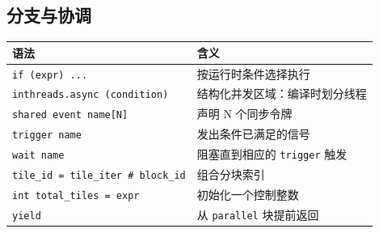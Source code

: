 \subsection*{分支与协调}

\begin{table}[htbp]\centering\small
\begin{tabularx}{\linewidth}{@{}lX@{}}
\toprule
\textbf{语法} & \textbf{含义} \\
\midrule
\texttt{if (expr) ...} & 按运行时条件选择执行 \\
\texttt{inthreads.async (condition)} & 结构化并发区域：编译时划分线程 \\
\texttt{shared event name[N]} & 声明 N 个同步令牌 \\
\texttt{trigger name} & 发出条件已满足的信号 \\
\texttt{wait name} & 阻塞直到相应的 \texttt{trigger} 触发 \\
\texttt{tile\_id = tile\_iter \# block\_id} & 组合分块索引 \\
\texttt{int total\_tiles = expr} & 初始化一个控制整数 \\
\texttt{yield} & 从 \texttt{parallel} 块提前返回 \\
\bottomrule
\end{tabularx}
\end{table}
